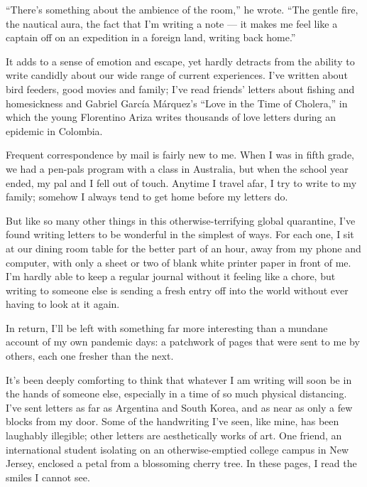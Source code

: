 ``There's something about the ambience of the room,'' he wrote. ``The
gentle fire, the nautical aura, the fact that I'm writing a note --- it
makes me feel like a captain off on an expedition in a foreign land,
writing back home.''

It adds to a sense of emotion and escape, yet hardly detracts from the
ability to write candidly about our wide range of current experiences.
I've written about bird feeders, good movies and family; I've read
friends' letters about fishing and homesickness and Gabriel García
Márquez's ``Love in the Time of Cholera,'' in which the young Florentino
Ariza writes thousands of love letters during an epidemic in Colombia.

Frequent correspondence by mail is fairly new to me. When I was in fifth
grade, we had a pen-pals program with a class in Australia, but when the
school year ended, my pal and I fell out of touch. Anytime I travel
afar, I try to write to my family; somehow I always tend to get home
before my letters do.

But like so many other things in this otherwise-terrifying global
quarantine, I've found writing letters to be wonderful in the simplest
of ways. For each one, I sit at our dining room table for the better
part of an hour, away from my phone and computer, with only a sheet or
two of blank white printer paper in front of me. I'm hardly able to keep
a regular journal without it feeling like a chore, but writing to
someone else is sending a fresh entry off into the world without ever
having to look at it again.

In return, I'll be left with something far more interesting than a
mundane account of my own pandemic days: a patchwork of pages that were
sent to me by others, each one fresher than the next.

It's been deeply comforting to think that whatever I am writing will
soon be in the hands of someone else, especially in a time of so much
physical distancing. I've sent letters as far as Argentina and South
Korea, and as near as only a few blocks from my door. Some of the
handwriting I've seen, like mine, has been laughably illegible; other
letters are aesthetically works of art. One friend, an international
student isolating on an otherwise-emptied college campus in New Jersey,
enclosed a petal from a blossoming cherry tree. In these pages, I read
the smiles I cannot see.

